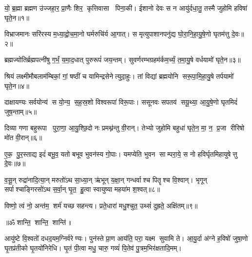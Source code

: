 

यो॒ ब्र॒ह्मा ब्रह्मण उ॑ज्जहा॒र॒ प्रा॒णैः शिर॒ कृत्तिवासा पिना॒की।
ईशानो देवः स न आयु॑र्दधा॒तु॒ तस्मै जुहोमि हविषा॑ घृते॒न॥१॥

विभ्राजमानः सरि॑रस्य म॒ध्या॒द्रो॒च॒मा॒नो घर्मरुचि॑र्य आ॒गात्।
स मृत्युपाशानपनु॑द्य घो॒रा॒नि॒हा॒यु॒षे॒णो घृतम॑त्तु दे॒वः॥२॥

ब्रह्मज्योतिर्ब्रह्मपत्नी॑षु  ग॒र्भं॒ य॒मा॒द॒धात् पुरुरूपं॑ जय॒न्तम्।
सुवर्णरम्भग्रहम॑र्कम॒र्च्यं॒ त॒मा॒यु॒षे वर्धयामो॑ घृते॒न॥३॥

श्रियं लक्ष्मीमौबलाम॑म्बिकां॒ गां॒ षष्ठीं च यामिन्द्रसेनेत्युदा॒हुः।
तां विद्यां ब्रह्मयोनि सरू॒पा॒मि॒हा॒यु॒षे तर्पयामो॑ घृते॒न॥४॥

दाक्षायण्यः सर्वयोन्य॑ स यो॒न्य॒ स॒ह॒स्र॒शो विश्वरूपा॑ विरू॒पाः।
ससूनवः सपतय॑ सयू॒थ्या॒ आ॒यु॒षे॒णो घृतमिदं॑ जुष॒न्ताम्॥५॥

दिव्या गणा बहुरूपा पुरा॒णा॒ आ॒यु॒श्छि॒दो नः प्रमथ्न॑न्तु वी॒रान्।
तेभ्यो जुहोमि बहुधा॑ घृते॒न॒ मा॒ न॒ प्र॒जा रीरिषो मो॑त वी॒रान्॥६॥

ए॒क॒ पु॒र॒स्ताद्य इदं॑ बभू॒व॒ यतो बभूव भुवन॑स्य गो॒पाः।
यमप्येति भुवन साम्परा॒ये॒ स नो हविर्घृतमिहायुषेत्तु दे॒वः॥७॥

व॒सू॒न् रुद्रा॑नादि॒त्या॒न् मरुतो॑ऽथ सा॒ध्या॒न् ऋ॑भून् य॒क्षा॒न् गन्धर्वाश्च पितॄश्च वि॒श्वान्।
 भृगून् सर्पाश्चाङ्गिरसो॑ऽथ स॒र्वा॒न् घृ॒त॒ हु॒त्वा स्वायुष्या महया॑म श॒श्वत्॥८॥

विष्णो॒ त्वं नो॒ अन्त॑म॒ शर्म॑ यच्छ सहन्त्य।
प्रते॒धारा॑ मधु॒श्चुत॒ उथ्सं॑ दुह्रते॒ अक्षि॑तम्॥९॥

\centerline{॥ॐ शान्ति॒ शान्ति॒ शान्ति॑॥}

\closesection

आयु॑ष्टे वि॒श्वतो॑ दधद॒यम॒ग्निर्वरेण्यः। पुन॑स्ते प्रा॒ण आय॑ति॒ परा॒ यक्ष्म सुवामि ते। आ॒यु॒र्दा अ॑ग्ने ह॒विषो॑ जुषा॒णो घृ॒तप्र॑तीको घृ॒तयो॑निरेधि। घृ॒तं पी॒त्वा मधु॒ चारु॒ गव्यं॑ पि॒तेव॑ पु॒त्रम॒भिर॑क्षतादि॒मम्।